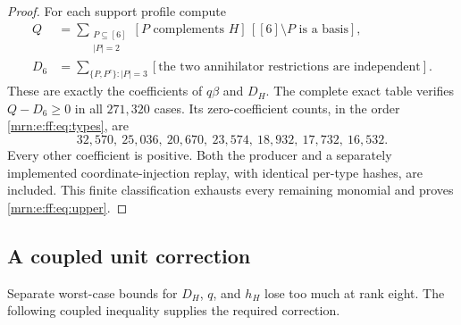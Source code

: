 \documentclass[11pt,a4paper]{article}
\theoremstyle{remark}\newtheorem{remark}[theorem]{Remark}
\begin{document}
\begin{proof}
For each support profile compute
\begin{align*}
 Q&=\sum_{\substack{P\subseteq[6]\\|P|=2}}
 [P\text{ complements }H]\,[[6]\setminus P\text{ is a basis}],\\
 D_6&=\sum_{\{P,P^c\}:|P|=3}
 [\text{the two annihilator restrictions are independent}].
\end{align*}
These are exactly the coefficients of $q\beta$ and $D_H$. The complete exact table verifies $Q-D_6\ge0$ in all $271{,}320$ cases. Its zero-coefficient counts, in the order \eqref{mrn:e:ff:eq:types}, are
\[
 32{,}570,\ 25{,}036,\ 20{,}670,\ 23{,}574,\
 18{,}932,\ 17{,}732,\ 16{,}532.
\]
Every other coefficient is positive. Both the producer and a separately implemented coordinate-injection replay, with identical per-type hashes, are included. This finite classification exhausts every remaining monomial and proves \eqref{mrn:e:ff:eq:upper}.
\end{proof}

\subsection{A coupled unit correction}
Separate worst-case bounds for $D_H$, $q$, and $h_H$ lose too much at rank eight. The following coupled inequality supplies the required correction.
\end{document}

